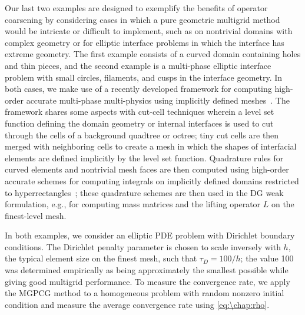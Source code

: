 Our last two examples are designed to exemplify the benefits of operator coarsening by considering cases in which a pure geometric multigrid method would be intricate or difficult to implement, such as on nontrivial domains with complex geometry or for elliptic interface problems in which the interface has extreme geometry. The first example consists of a curved domain containing holes and thin pieces, and the second example is a multi-phase elliptic interface problem with small circles, filaments, and cusps in the interface geometry. In both cases, we make use of a recently developed framework for computing high-order accurate multi-phase multi-physics using implicitly defined meshes~\cite{Saye_17_01, Saye_17_02}. The framework shares some aspects with cut-cell techniques wherein a level set function defining the domain geometry or internal interfaces is used to cut through the cells of a background quadtree or octree; tiny cut cells are then merged with neighboring cells to create a mesh in which the shapes of interfacial elements are defined implicitly by the level set function. Quadrature rules for curved elements and nontrivial mesh faces are then computed using high-order accurate schemes for computing integrals on implicitly defined domains restricted to hyperrectangles~\cite{Saye_15_01}; these quadrature schemes are then used in the DG weak formulation, e.g., for computing mass matrices and the lifting operator $L$ on the finest-level mesh.

In both examples, we consider an elliptic PDE problem with Dirichlet boundary conditions. The Dirichlet penalty parameter is chosen to scale inversely with $h$, the typical element size on the finest mesh, such that $\tau_D = 100/h$; the value 100 was determined empirically as being approximately the smallest possible while giving good multigrid performance. 
To measure the convergence rate, we apply the MGPCG method to a homogeneous problem with random nonzero initial condition and measure the average convergence rate using \cref{eq:\chap:rho}.

